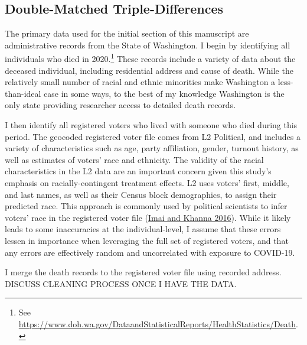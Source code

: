 \documentclass[
  12pt,
]{article}
\begin{document}
\hypertarget{double-matched-triple-differences}{%
\subsection*{Double-Matched Triple-Differences}\label{double-matched-triple-differences}}

The primary data used for the initial section of this manuscript are administrative records from the State of Washington. I begin by identifying all individuals who died in 2020.\footnote{See \url{https://www.doh.wa.gov/DataandStatisticalReports/HealthStatistics/Death}.} These records include a variety of data about the deceased individual, including residential address and cause of death. While the relatively small number of racial and ethnic minorities make Washington a less-than-ideal case in some ways, to the best of my knowledge Washington is the only state providing researcher access to detailed death records.

I then identify all registered voters who lived with someone who died during this period. The geocoded registered voter file comes from L2 Political, and includes a variety of characteristics such as age, party affiliation, gender, turnout history, as well as estimates of voters' race and ethnicity. The validity of the racial characteristics in the L2 data are an important concern given this study's emphasis on racially-contingent treatment effects. L2 uses voters' first, middle, and last names, as well as their Census block demographics, to assign their predicted race. This approach is commonly used by political scientists to infer voters' race in the registered voter file (\protect\hyperlink{ref-Imai2016}{Imai and Khanna 2016}). While it likely leads to some inaccuracies at the individual-level, I assume that these errors lessen in importance when leveraging the full set of registered voters, and that any errors are effectively random and uncorrelated with exposure to COVID-19.

I merge the death records to the registered voter file using recorded address. DISCUSS CLEANING PROCESS ONCE I HAVE THE DATA.
\end{document}
